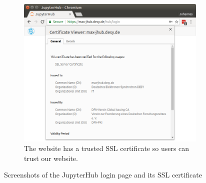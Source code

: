 \documentclass[10pt]{scrartcl}
\begin{document}
\begin{figure}
\begin{subfigure}{0.45\textwidth}
	  \includegraphics[width=\textwidth]{figures/jhub002.png}
	  \caption{The website has a trusted SSL certificate so users can trust our website.} %
  \end{subfigure}
  \caption{Screenshots of the JupyterHub login page and its SSL certificate}
  \label{fig:jhub_start}
\end{figure}
\end{document}

